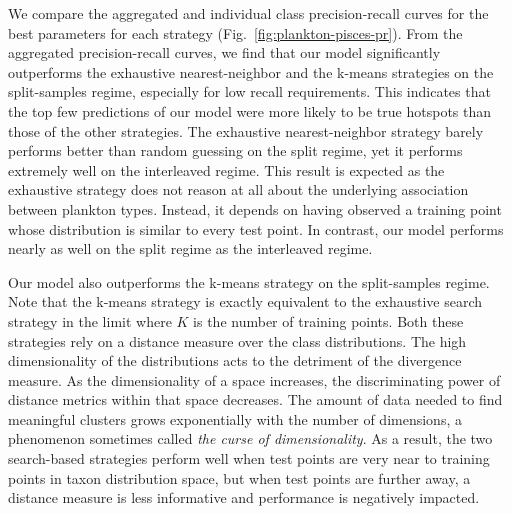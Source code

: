 We compare the aggregated and individual class precision-recall curves for the best parameters for each strategy (Fig.~\ref{fig:plankton-pisces-pr}). From the aggregated precision-recall curves, we find that our model significantly outperforms the exhaustive nearest-neighbor and the k-means strategies on the split-samples regime, especially for low recall requirements. This indicates that the top few predictions of our model were more likely to be true hotspots than those of the other strategies. The exhaustive nearest-neighbor strategy barely performs better than random guessing on the split regime, yet it performs extremely well on the interleaved regime. This result is expected as the exhaustive strategy does not reason at all about the underlying association between plankton types. Instead, it depends on having observed a training point whose distribution is similar to every test point. In contrast, our model performs nearly as well on the split regime as the interleaved regime.

Our model also outperforms the k-means strategy on the split-samples regime. Note that the k-means strategy is exactly equivalent to the exhaustive search strategy in the limit where $K$ is the number of training points. Both these strategies rely on a distance measure over the class distributions. The high dimensionality of the distributions acts to the detriment of the divergence measure. As the dimensionality of a space increases, the discriminating power of distance metrics within that space decreases. The amount of data needed to find meaningful clusters grows exponentially with the number of dimensions, a phenomenon sometimes called \textit{the curse of dimensionality}. As a result, the two search-based strategies perform well when test points are very near to training points in taxon distribution space, but when test points are further away, a distance measure is less informative and performance is negatively impacted.

